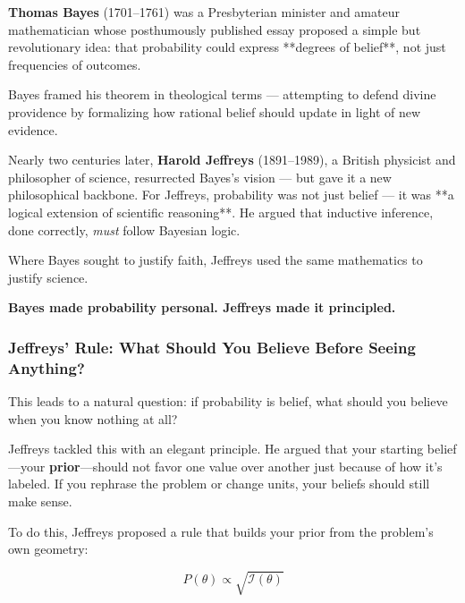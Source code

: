 \begin{tcolorbox}[colback=gray!5!white, colframe=black!80!white, title={Historical Sidenote: From Bayes’s Theology to Jeffreys’s Science}]

  \textbf{Thomas Bayes} (1701–1761) was a Presbyterian minister and amateur mathematician whose posthumously published essay proposed a simple but revolutionary idea: that probability could express **degrees of belief**, not just frequencies of outcomes.
  
  Bayes framed his theorem in theological terms — attempting to defend divine providence by formalizing how rational belief should update in light of new evidence.
  
  \medskip
  
  Nearly two centuries later, \textbf{Harold Jeffreys} (1891–1989), a British physicist and philosopher of science, resurrected Bayes’s vision — but gave it a new philosophical backbone. For Jeffreys, probability was not just belief — it was **a logical extension of scientific reasoning**. He argued that inductive inference, done correctly, \textit{must} follow Bayesian logic.
  
  Where Bayes sought to justify faith, Jeffreys used the same mathematics to justify science.
  
  \medskip
  
  \textbf{Bayes made probability personal. Jeffreys made it principled.}
  
  \end{tcolorbox}
  


\subsubsection{Jeffreys’ Rule: What Should You Believe Before Seeing Anything?}

This leads to a natural question: if probability is belief, what should you believe when you know nothing at all?

Jeffreys tackled this with an elegant principle. He argued that your starting belief—your \textbf{prior}—should not favor one value over another just because of how it's labeled. If you rephrase the problem or change units, your beliefs should still make sense.

To do this, Jeffreys proposed a rule that builds your prior from the problem’s own geometry:

\[
\boxed{
P(\theta) \propto \sqrt{\mathcal{I}(\theta)}
}
\]

